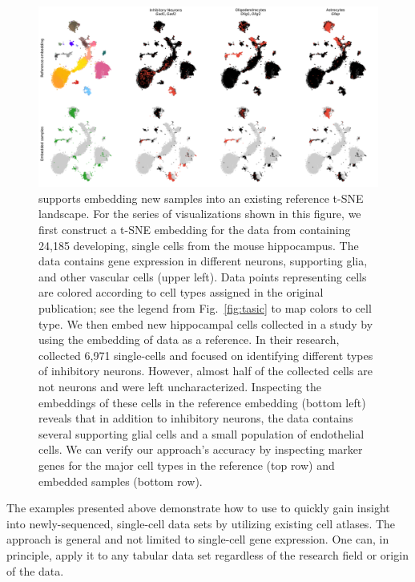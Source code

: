 \documentclass[article]{jss}
\newcommand{\opentsne}{\pkg{openTSNE}\xspace}
\begin{document}
\begin{figure}[htbp]
  \includegraphics[width=\textwidth]{transform_hochgerner}
  \caption{\label{fig:transform}
  \opentsne supports embedding new samples into an existing reference t-SNE landscape. For the series of visualizations shown in this figure, we first construct a t-SNE embedding for the data from \citet{hochgerner2018conserved} containing 24,185 developing, single cells from the mouse hippocampus. The data contains gene expression in different neurons, supporting glia, and other vascular cells (upper left). Data points representing cells are colored according to cell types assigned in the original publication; see the legend from Fig.~\ref{fig:tasic} to map colors to cell type. We then embed new hippocampal cells collected in a study by \citet{harris2018classes} using the embedding of \citet{hochgerner2018conserved} data as a reference. In their research, \citet{harris2018classes} collected 6,971 single-cells and focused on identifying different types of inhibitory neurons. However, almost half of the collected cells are not neurons and were left uncharacterized. Inspecting the embeddings of these cells in the reference embedding (bottom left) reveals that in addition to inhibitory neurons, the data contains several supporting glial cells and a small population of endothelial cells. We can verify our approach's accuracy by inspecting marker genes for the major cell types in the reference (top row) and embedded samples (bottom row). }
\end{figure}

The examples presented above demonstrate how to use \opentsne to quickly gain insight into newly-sequenced, single-cell data sets by utilizing existing cell atlases. The approach is general and not limited to single-cell gene expression. One can, in principle, apply it to any tabular data set regardless of the research field or origin of the data.
\end{document}
